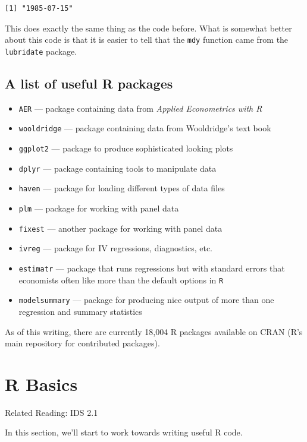 \documentclass[
  letterpaper,
  DIV=11,
  numbers=noendperiod]{scrreprt}
\begin{document}
\begin{verbatim}
[1] "1985-07-15"
\end{verbatim}

This does exactly the same thing as the code before. What is somewhat
better about this code is that it is easier to tell that the
\texttt{mdy} function came from the \texttt{lubridate} package.

\subsection{A list of useful R
packages}\label{a-list-of-useful-r-packages}

\begin{itemize}
\item
  \texttt{AER} --- package containing data from \emph{Applied
  Econometrics with R}
\item
  \texttt{wooldridge} --- package containing data from Wooldridge's text
  book
\item
  \texttt{ggplot2} --- package to produce sophisticated looking plots
\item
  \texttt{dplyr} --- package containing tools to manipulate data
\item
  \texttt{haven} --- package for loading different types of data files
\item
  \texttt{plm} --- package for working with panel data
\item
  \texttt{fixest} --- another package for working with panel data
\item
  \texttt{ivreg} --- package for IV regressions, diagnostics, etc.
\item
  \texttt{estimatr} --- package that runs regressions but with standard
  errors that economists often like more than the default options in
  \texttt{R}
\item
  \texttt{modelsummary} --- package for producing nice output of more
  than one regression and summary statistics
\end{itemize}

As of this writing, there are currently 18,004 R packages available on
CRAN (R's main repository for contributed packages).

\section{R Basics}\label{r-basics}

Related Reading: IDS 2.1

In this section, we'll start to work towards writing useful R code.
\end{document}
